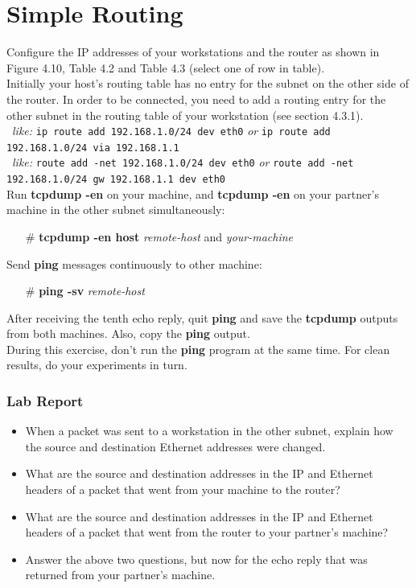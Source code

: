 \documentclass[10pt,a4paper]{article}
\numberwithin{equation}{section}
\numberwithin{figure}{section}
\numberwithin{table}{section}
\begin{document}
\section{Simple Routing}
    Configure the IP addresses of your workstations and the router as shown in Figure 4.10, Table 4.2 and Table 4.3 (select one of row in table). \\
    Initially your host’s routing table has no entry for the subnet on the other side of the router.
    In order to be connected, you need to add a routing entry for the other subnet in the routing table of your workstation (see section 4.3.1). \\
    \, \textit{like: }\texttt{ip route add 192.168.1.0/24 dev eth0} \textit{or} \texttt{ip route add 192.168.1.0/24 via 192.168.1.1} \\
    \, \textit{like: } \texttt{route add -net 192.168.1.0/24 dev eth0} \textit{or} \texttt{route add -net 192.168.1.0/24 gw 192.168.1.1 dev eth0}\\
    Run \textbf{tcpdump -en} on your machine, and \textbf{tcpdump -en} on your partner’s machine in the other subnet simultaneously:
    \begin{itemize}
        \item [\#] \textbf{tcpdump -en host} \textit{remote-host} and \textit{your-machine}
    \end{itemize}
    Send \textbf{ping} messages continuously to other machine:
    \begin{itemize}
        \item [\#] \textbf{ping -sv} \textit{remote-host}
    \end{itemize}
    After receiving the tenth echo reply, quit \textbf{ping} and save the \textbf{tcpdump} outputs from both machines.
    Also, copy the \textbf{ping} output. \\
    During this exercise, don’t run the \textbf{ping} program at the same time.
    For clean results, do your experiments in turn.
    \subsubsection*{Lab Report}
    \begin{itemize}
        \setlength{\itemindent}{0pt}
        \item When a packet was sent to a workstation in the other subnet, explain how the source and destination Ethernet addresses were changed.
        \item What are the source and destination addresses in the IP and Ethernet headers of a packet that went from your machine to the router?
        \item What are the source and destination addresses in the IP and Ethernet headers of a packet that went from the router to your partner’s machine?
        \item Answer the above two questions, but now for the echo reply that was returned from your partner’s machine.
    \end{itemize}
\end{document}
